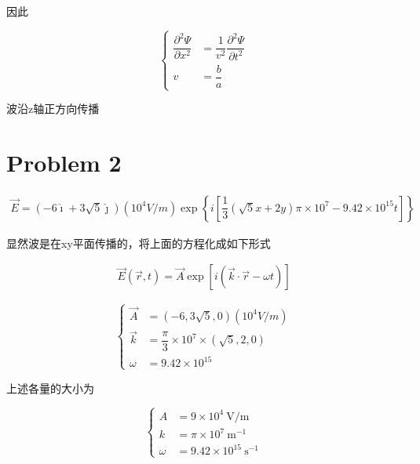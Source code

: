 \documentclass{article}
\begin{document}
因此

\begin{equation*}
  \left\{
  \begin{aligned}
    \dfrac{\partial^2 \Psi }{\partial x^2 } &= \dfrac{1}{v^2} \dfrac{\partial^2 \Psi}{\partial t^2} \\
    v &= \dfrac{b}{a}
  \end{aligned}
  \right.
\end{equation*}

波沿z轴正方向传播

\section{Problem 2}

\begin{equation*}
  \begin{aligned}
    \vec{E} = \left( - 6 \hat{\imath} + 3 \sqrt{5} \hat{\jmath}  \right) \left( 10^4 V/m \right) \exp \left\{ i \left[ \dfrac{1}{3} \left( \sqrt{5} x + 2 y \right) \pi \times 10^7 - 9.42 \times 10^{15} t  \right] \right\}
  \end{aligned}
\end{equation*}

显然波是在xy平面传播的，将上面的方程化成如下形式

\begin{equation*}
  \begin{aligned}
    \vec{E} \left( \vec{r}, t \right) = \vec{A} \exp \left[ i \left( \vec{k} \cdot \vec{r} - \omega t \right) \right]
  \end{aligned}
\end{equation*}

\begin{equation*}
  \left\{
  \begin{aligned}
    \vec{A} &= \left( -6, 3 \sqrt{5}, 0 \right) \left( 10^4 V/m \right) \\
    \vec{k} &= \dfrac{\pi}{3} \times 10^7 \times \left( \sqrt{5}, 2, 0 \right) \\
    \omega &= 9.42 \times 10^{15} 
  \end{aligned}
  \right.
\end{equation*}

上述各量的大小为

\begin{equation*}
  \left\{
  \begin{aligned}
    A &=  9 \times 10^4 \  \mathrm{V / m} \\
    k &= \pi \times 10^7 \ \mathrm{m^{-1}}\\
    \omega &= 9.42 \times 10^{15} \  \mathrm{s^{-1}}
  \end{aligned}
  \right.
\end{equation*}
\end{document}
